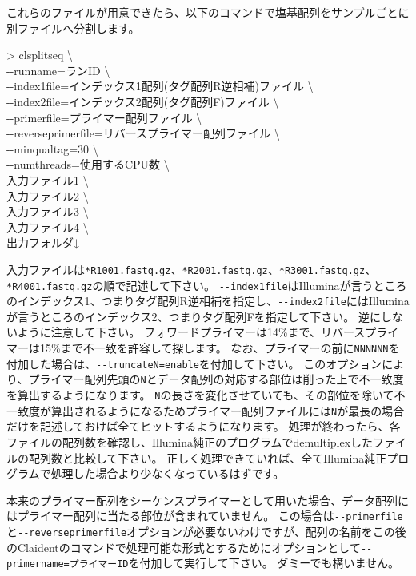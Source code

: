 \documentclass[titlepage,10pt,a4paper]{jsbook}
\newenvironment{cmd}{\begin{oframed}\raggedright\ttfamily\footnotesize\setlength{\baselineskip}{1.4em}}{\end{oframed}\vspace{-1em}}
\begin{document}
これらのファイルが用意できたら、以下のコマンドで塩基配列をサンプルごとに別ファイルへ分割します。
\begin{cmd}
{\textgreater} clsplitseq {\textbackslash}\\
{-}{-}runname=ランID {\textbackslash}\\
{-}{-}index1file=インデックス1配列(タグ配列R逆相補)ファイル {\textbackslash}\\
{-}{-}index2file=インデックス2配列(タグ配列F)ファイル {\textbackslash}\\
{-}{-}primerfile=プライマー配列ファイル {\textbackslash}\\
{-}{-}reverseprimerfile=リバースプライマー配列ファイル {\textbackslash}\\
{-}{-}minqualtag=30 {\textbackslash}\\
{-}{-}numthreads=使用するCPU数 {\textbackslash}\\
入力ファイル1 {\textbackslash}\\
入力ファイル2 {\textbackslash}\\
入力ファイル3 {\textbackslash}\\
入力ファイル4 {\textbackslash}\\
出力フォルダ↓
\end{cmd}
入力ファイルは\texttt{*{\textunderscore}R1{\textunderscore}001.fastq.gz}、\texttt{*{\textunderscore}R2{\textunderscore}001.fastq.gz}、\texttt{*{\textunderscore}R3{\textunderscore}001.fastq.gz}、\texttt{*{\textunderscore}R4{\textunderscore}001.fastq.gz}の順で記述して下さい。
\texttt{{-}{-}index1file}はIlluminaが言うところのインデックス1、つまりタグ配列R逆相補を指定し、\texttt{{-}{-}index2file}にはIlluminaが言うところのインデックス2、つまりタグ配列Fを指定して下さい。
逆にしないように注意して下さい。
フォワードプライマーは14\%まで、リバースプライマーは15\%まで不一致を許容して探します。
なお、プライマーの前に\texttt{NNNNNN}を付加した場合は、\texttt{{-}{-}truncateN=enable}を付加して下さい。
このオプションにより、プライマー配列先頭の\texttt{N}とデータ配列の対応する部位は削った上で不一致度を算出するようになります。
\texttt{N}の長さを変化させていても、その部位を除いて不一致度が算出されるようになるためプライマー配列ファイルには\texttt{N}が最長の場合だけを記述しておけば全てヒットするようになります。
処理が終わったら、各ファイルの配列数を確認し、Illumina純正のプログラムでdemultiplexしたファイルの配列数と比較して下さい。
正しく処理できていれば、全てIllumina純正プログラムで処理した場合より少なくなっているはずです。

本来のプライマー配列をシーケンスプライマーとして用いた場合、データ配列にはプライマー配列に当たる部位が含まれていません。
この場合は\texttt{{-}{-}primerfile}と\texttt{{-}{-}reverseprimerfile}オプションが必要ないわけですが、配列の名前をこの後のClaidentのコマンドで処理可能な形式とするためにオプションとして\texttt{{-}{-}primername=プライマーID}を付加して実行して下さい。
ダミーでも構いません。
\end{document}
